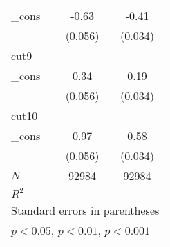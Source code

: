 {\begin{tabular}{l*{2}{c}}
\_cons      &       -0.63\sym{***}&       -0.41\sym{***}\\
            &     (0.056)         &     (0.034)         \\
\hline
cut9        &                     &                     \\
\_cons      &        0.34\sym{***}&        0.19\sym{***}\\
            &     (0.056)         &     (0.034)         \\
\hline
cut10       &                     &                     \\
\_cons      &        0.97\sym{***}&        0.58\sym{***}\\
            &     (0.056)         &     (0.034)         \\
\hline
\(N\)       &       92984         &       92984         \\
\(R^{2}\)   &                     &                     \\
\hline\hline
\multicolumn{3}{l}{\footnotesize Standard errors in parentheses}\\
\multicolumn{3}{l}{\footnotesize \sym{*} \(p<0.05\), \sym{**} \(p<0.01\), \sym{***} \(p<0.001\)}\\
\end{tabular}
}
